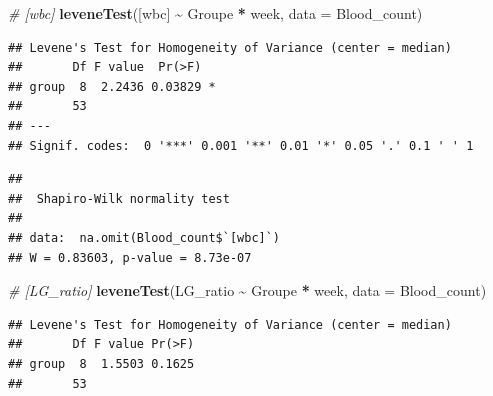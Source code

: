 \documentclass[
]{article}
\newenvironment{Shaded}{\begin{snugshade}}{\end{snugshade}}
\newcommand{\AttributeTok}[1]{\textcolor[rgb]{0.13,0.29,0.53}{#1}}
\newcommand{\CommentTok}[1]{\textcolor[rgb]{0.56,0.35,0.01}{\textit{#1}}}
\newcommand{\FunctionTok}[1]{\textcolor[rgb]{0.13,0.29,0.53}{\textbf{#1}}}
\newcommand{\NormalTok}[1]{#1}
\newcommand{\SpecialCharTok}[1]{\textcolor[rgb]{0.81,0.36,0.00}{\textbf{#1}}}
\newcommand{\StringTok}[1]{\textcolor[rgb]{0.31,0.60,0.02}{#1}}
\begin{document}
\begin{Shaded}
\begin{Highlighting}[]
\CommentTok{\# [wbc]}
\FunctionTok{leveneTest}\NormalTok{(}\StringTok{\textasciigrave{}}\AttributeTok{[wbc]}\StringTok{\textasciigrave{}} \SpecialCharTok{\textasciitilde{}}\NormalTok{ Groupe }\SpecialCharTok{*}\NormalTok{ week, }\AttributeTok{data =}\NormalTok{ Blood\_count)}
\end{Highlighting}
\end{Shaded}

\begin{verbatim}
## Levene's Test for Homogeneity of Variance (center = median)
##       Df F value  Pr(>F)  
## group  8  2.2436 0.03829 *
##       53                  
## ---
## Signif. codes:  0 '***' 0.001 '**' 0.01 '*' 0.05 '.' 0.1 ' ' 1
\end{verbatim}

\begin{Shaded}
\end{Shaded}

\begin{verbatim}
## 
##  Shapiro-Wilk normality test
## 
## data:  na.omit(Blood_count$`[wbc]`)
## W = 0.83603, p-value = 8.73e-07
\end{verbatim}

\begin{Shaded}
\begin{Highlighting}[]
\CommentTok{\# [LG\_ratio]}
\FunctionTok{leveneTest}\NormalTok{(}\StringTok{\textasciigrave{}}\AttributeTok{LG\_ratio}\StringTok{\textasciigrave{}} \SpecialCharTok{\textasciitilde{}}\NormalTok{ Groupe }\SpecialCharTok{*}\NormalTok{ week, }\AttributeTok{data =}\NormalTok{ Blood\_count)}
\end{Highlighting}
\end{Shaded}

\begin{verbatim}
## Levene's Test for Homogeneity of Variance (center = median)
##       Df F value Pr(>F)
## group  8  1.5503 0.1625
##       53
\end{verbatim}

\begin{Shaded}
\end{Shaded}
\end{document}
